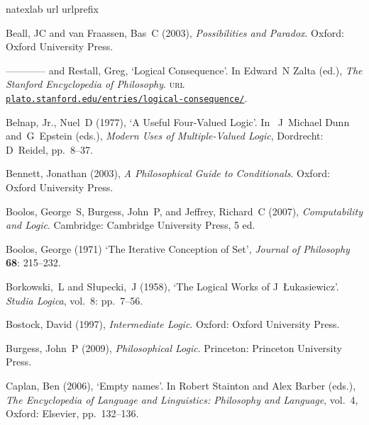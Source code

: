 \documentclass[openany,leqno,11pt,draft]{book}
\theoremstyle{break}
\theoremstyle{definition}
\theoremstyle{remark}
\begin{document}
{\small {}\label{biblio}
\begin{thebibliography}{39}
\newcommand{\enquote}[1]{‘#1’}
\expandafter\ifx\csname natexlab\endcsname\relax\def\natexlab#1{#1}\fi
\expandafter\ifx\csname url\endcsname\relax
  \def\url#1{{\tt #1}}\fi
\expandafter\ifx\csname urlprefix\endcsname\relax\def\urlprefix{\textsc{url} }\fi

Beall, JC and van Fraassen, Bas~C (2003), \emph{Possibilities and Paradox}.
  Oxford: Oxford University Press.

---\!\!---\!\!---\!\!--- and Restall, Greg, \enquote{Logical Consequence}.  In Edward~N Zalta (ed.), \emph{The Stanford Encyclopedia of Philosophy}. \urlprefix\href{http://plato.stanford.edu/entries/logical-consequence/}{\nolinkurl{plato.stanford.edu/entries/logical-consequence/}}.

{Belnap, Jr.}, Nuel~D (1977), \enquote{A Useful Four-Valued Logic}. In
 ~J~Michael Dunn and~G~Epstein (eds.), \emph{Modern Uses of Multiple-Valued
  Logic}, Dordrecht: D~Reidel, pp.~8–37.

Bennett, Jonathan (2003), \emph{A Philosophical Guide to Conditionals}.
  Oxford: Oxford University Press.

Boolos, George~S, Burgess, John~P, and Jeffrey, Richard~C (2007), \emph{
  Computability and Logic}. Cambridge: Cambridge University Press, 5 ed.

 Boolos, George (1971) ‘The Iterative Conception of Set’, \emph{Journal of Philosophy} \textbf{68}: 215–232.


Borkowski,~L and S{\l}upecki,~J (1958), \enquote{The Logical Works of J~{\L}ukasiewicz}. \emph{Studia Logica}, vol.~8: pp.~7–56.

Bostock, David (1997), \emph{Intermediate Logic}. Oxford: Oxford University
  Press.

Burgess, John~P (2009), \emph{Philosophical Logic}. Princeton: Princeton
  University Press.

Caplan, Ben (2006), \enquote{Empty names}. In Robert Stainton and Alex Barber
  (eds.), \emph{The Encyclopedia of Language and Linguistics: Philosophy and
  Language}, vol.~4, Oxford: Elsevier, pp.~132–136.


\end{thebibliography}}
\end{document}
